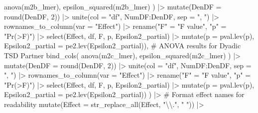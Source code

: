 \documentclass[
  bookmarksnumbered]{article}
\newenvironment{Shaded}{\begin{snugshade}}{\end{snugshade}}
\newcommand{\AttributeTok}[1]{\textcolor[rgb]{0.80,0.80,0.80}{#1}}
\newcommand{\CommentTok}[1]{\textcolor[rgb]{0.50,0.62,0.50}{#1}}
\newcommand{\DecValTok}[1]{\textcolor[rgb]{0.86,0.86,0.80}{#1}}
\newcommand{\FunctionTok}[1]{\textcolor[rgb]{0.94,0.94,0.56}{#1}}
\newcommand{\NormalTok}[1]{\textcolor[rgb]{0.80,0.80,0.80}{#1}}
\newcommand{\OtherTok}[1]{\textcolor[rgb]{0.94,0.94,0.56}{#1}}
\newcommand{\SpecialCharTok}[1]{\textcolor[rgb]{0.86,0.64,0.64}{#1}}
\newcommand{\StringTok}[1]{\textcolor[rgb]{0.80,0.58,0.58}{#1}}
\begin{document}
\begin{Shaded}
\begin{Highlighting}[]
    \FunctionTok{anova}\NormalTok{(m2b\_lmer),}
    \FunctionTok{epsilon\_squared}\NormalTok{(m2b\_lmer)}
\NormalTok{  ) }\SpecialCharTok{|\textgreater{}}
    \FunctionTok{mutate}\NormalTok{(}\AttributeTok{DenDF =} \FunctionTok{round}\NormalTok{(DenDF, }\DecValTok{2}\NormalTok{)) }\SpecialCharTok{|\textgreater{}}
    \FunctionTok{unite}\NormalTok{(}\AttributeTok{col =} \StringTok{"df"}\NormalTok{, NumDF}\SpecialCharTok{:}\NormalTok{DenDF, }\AttributeTok{sep =} \StringTok{", "}\NormalTok{) }\SpecialCharTok{|\textgreater{}}
    \FunctionTok{rownames\_to\_column}\NormalTok{(}\AttributeTok{var =} \StringTok{"Effect"}\NormalTok{) }\SpecialCharTok{|\textgreater{}}
    \FunctionTok{rename}\NormalTok{(}\StringTok{"F"} \OtherTok{=} \StringTok{"F value"}\NormalTok{, }\StringTok{"p"} \OtherTok{=} \StringTok{"Pr(\textgreater{}F)"}\NormalTok{) }\SpecialCharTok{|\textgreater{}}
    \FunctionTok{select}\NormalTok{(Effect, df, F, p, Epsilon2\_partial) }\SpecialCharTok{|\textgreater{}}
    \FunctionTok{mutate}\NormalTok{(}\AttributeTok{p =} \FunctionTok{pval.lev}\NormalTok{(p), }\AttributeTok{Epsilon2\_partial =} \FunctionTok{pe2.lev}\NormalTok{(Epsilon2\_partial)),}
  \CommentTok{\# ANOVA results for Dyadic TSD Partner}
  \FunctionTok{bind\_cols}\NormalTok{(}
    \FunctionTok{anova}\NormalTok{(m2c\_lmer),}
    \FunctionTok{epsilon\_squared}\NormalTok{(m2c\_lmer)}
\NormalTok{  ) }\SpecialCharTok{|\textgreater{}}
    \FunctionTok{mutate}\NormalTok{(}\AttributeTok{DenDF =} \FunctionTok{round}\NormalTok{(DenDF, }\DecValTok{2}\NormalTok{)) }\SpecialCharTok{|\textgreater{}}
    \FunctionTok{unite}\NormalTok{(}\AttributeTok{col =} \StringTok{"df"}\NormalTok{, NumDF}\SpecialCharTok{:}\NormalTok{DenDF, }\AttributeTok{sep =} \StringTok{", "}\NormalTok{) }\SpecialCharTok{|\textgreater{}}
    \FunctionTok{rownames\_to\_column}\NormalTok{(}\AttributeTok{var =} \StringTok{"Effect"}\NormalTok{) }\SpecialCharTok{|\textgreater{}}
    \FunctionTok{rename}\NormalTok{(}\StringTok{"F"} \OtherTok{=} \StringTok{"F value"}\NormalTok{, }\StringTok{"p"} \OtherTok{=} \StringTok{"Pr(\textgreater{}F)"}\NormalTok{) }\SpecialCharTok{|\textgreater{}}
    \FunctionTok{select}\NormalTok{(Effect, df, F, p, Epsilon2\_partial) }\SpecialCharTok{|\textgreater{}}
    \FunctionTok{mutate}\NormalTok{(}\AttributeTok{p =} \FunctionTok{pval.lev}\NormalTok{(p), }\AttributeTok{Epsilon2\_partial =} \FunctionTok{pe2.lev}\NormalTok{(Epsilon2\_partial))}
\NormalTok{) }\SpecialCharTok{|\textgreater{}}
  \CommentTok{\# Format effect names for readability}
  \FunctionTok{mutate}\NormalTok{(}\AttributeTok{Effect =} \FunctionTok{str\_replace\_all}\NormalTok{(Effect, }\StringTok{"}\SpecialCharTok{\textbackslash{}\textbackslash{}}\StringTok{."}\NormalTok{, }\StringTok{" "}\NormalTok{)) }\SpecialCharTok{|\textgreater{}}

\end{Highlighting}
\end{Shaded}
\end{document}
